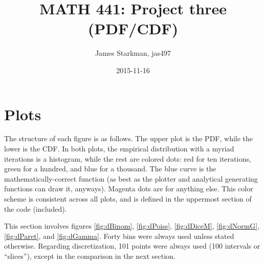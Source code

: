 \documentclass[letterpaper]{article}
\begin{document}

\title{MATH 441: Project three (PDF/CDF)}
\author{James Starkman, jas497}
\date{2015-11-16}
\maketitle

\section{Plots}
\label{sec:plots}

The structure of each figure is as follows.  The upper plot is the PDF, while
the lower is the CDF.  In both plots, the empirical distribution with a myriad
iterations is a histogram, while the rest are colored dots: red for ten
iterations, green for a hundred, and blue for a thousand.  The blue curve is the
mathematically-correct function (as best as the plotter and analytical
generating functions can draw it, anyways).  Magenta dots are for anything else.
This color scheme is consistent across all plots, and is defined in the
uppermost section of the code (included).

This section involves figures \ref{fig:dBinom}, \ref{fig:dPoiss},
\ref{fig:dDiceM}, \ref{fig:dNormG}, \ref{fig:dParet}, and \ref{fig:dGamma}.
Forty bins were always used unless stated otherwise.  Regarding discretization,
101 points were always used (100 intervals or ``slices''), except in the
comparison in the next section.
\end{document}
